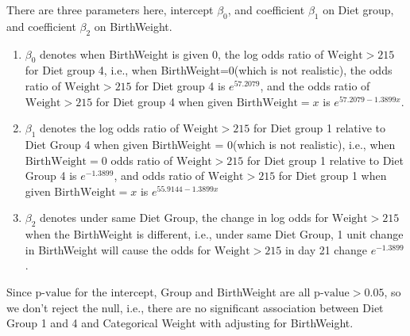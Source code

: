 \documentclass[10pt,letterpaper]{article}
\begin{document}
\begin{enumerate}[leftmargin=0cm,itemindent=.5cm,labelwidth=\itemindent,labelsep=0cm,align=left]
There are three parameters here, intercept $\beta_0$, and coefficient $\beta_1$ on Diet group, and coefficient $\beta_2$ on BirthWeight. 
\begin{enumerate}[leftmargin=0cm,itemindent=.5cm,labelwidth=\itemindent,labelsep=0cm,align=left]
\item[\textbullet] $\beta_0$ denotes when BirthWeight is given 0, the log odds ratio of $\text{Weight}>215$ for Diet group 4, i.e., when BirthWeight=0(which is not realistic), the odds ratio of $\text{Weight}>215$ for Diet group 4 is $e^{57.2079}$, and the odds ratio of $\text{Weight}>215$ for Diet group 4 when given $\text{BirthWeight}=x$ is $e^{57.2079-1.3899x}$.
\item[\textbullet] $\beta_1$ denotes the log odds ratio of $\text{Weight}>215$ for Diet group 1 relative to Diet Group 4 when given BirthWeight = 0(which is not realistic), i.e., when $\text{BirthWeight}=0$ odds ratio of $\text{Weight}>215$ for Diet group 1 relative to Diet Group 4 is $e^{-1.3899}$, and odds ratio of $\text{Weight}>215$ for Diet group 1 when given $\text{BirthWeight}=x$ is $e^{55.9144-1.3899x}$
\item[\textbullet] $\beta_2$ denotes under same Diet Group, the change in log odds for $\text{Weight}>215$ when the BirthWeight is different, i.e., under same Diet Group, 1 unit change in BirthWeight will cause the odds for $\text{Weight}>215$ in day 21 change $e^{-1.3899}$.
\end{enumerate}
Since $\text{p-value}$ for the intercept, Group and BirthWeight are all $\text{p-value}>0.05$, so we don't reject the null, i.e., there are no significant association between Diet Group 1 and 4 and Categorical Weight with adjusting for BirthWeight. 
\end{enumerate}
\end{document}
